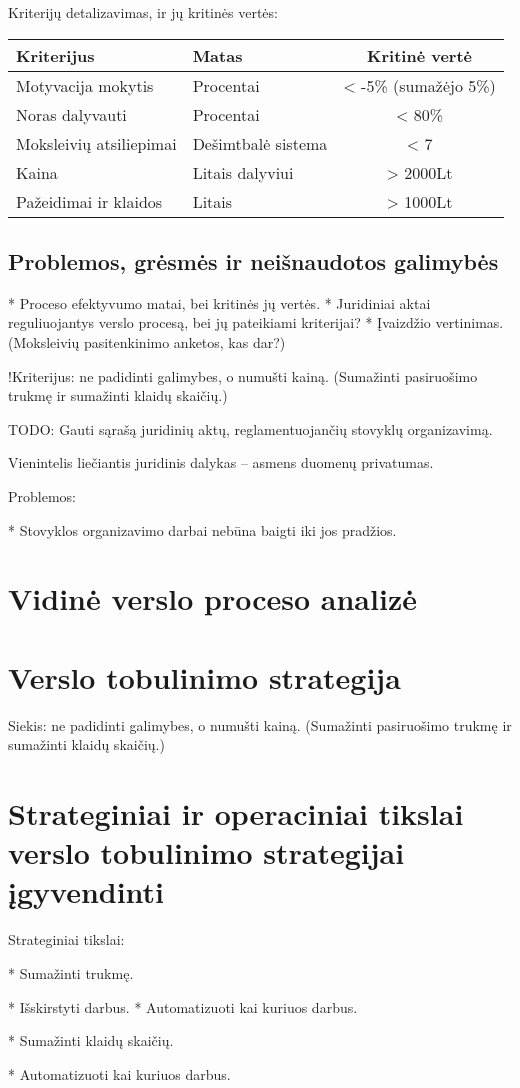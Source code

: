Kriterijų detalizavimas, ir jų kritinės vertės:

\begin{tabular}[]{| l | l | c |}
  \hline
  Kriterijus & Matas & Kritinė vertė \\
  \hline
  Motyvacija mokytis & Procentai & < -5\% (sumažėjo 5\%) \\
  \hline
  Noras dalyvauti & Procentai & < 80\% \\
  \hline
  Moksleivių atsiliepimai & Dešimtbalė sistema & < 7 \\
  \hline
  Kaina & Litais dalyviui & > 2000Lt \\
  \hline
  Pažeidimai ir klaidos & Litais & > 1000Lt \\
  \hline
\end{tabular}

\subsection{Problemos, grėsmės ir neišnaudotos galimybės}

* Proceso efektyvumo matai, bei kritinės jų vertės.
* Juridiniai aktai reguliuojantys verslo procesą, bei jų pateikiami 
  kriterijai?
* Įvaizdžio vertinimas. (Moksleivių pasitenkinimo anketos, kas dar?)


!Kriterijus: ne padidinti galimybes, o numušti kainą. (Sumažinti 
pasiruošimo trukmę ir sumažinti klaidų skaičių.)

TODO: Gauti sąrašą juridinių aktų, reglamentuojančių stovyklų organizavimą.

Vienintelis liečiantis juridinis dalykas – asmens duomenų privatumas.

Problemos:

* Stovyklos organizavimo darbai nebūna baigti iki jos pradžios.


\section{Vidinė verslo proceso analizė}

\section{Verslo tobulinimo strategija}

Siekis: ne padidinti galimybes, o numušti kainą. (Sumažinti 
pasiruošimo trukmę ir sumažinti klaidų skaičių.)


\section{Strateginiai ir operaciniai tikslai verslo tobulinimo %
  strategijai įgyvendinti}

Strateginiai tikslai:

* Sumažinti trukmę.

  * Išskirstyti darbus.
  * Automatizuoti kai kuriuos darbus.

* Sumažinti klaidų skaičių.

  * Automatizuoti kai kuriuos darbus.
